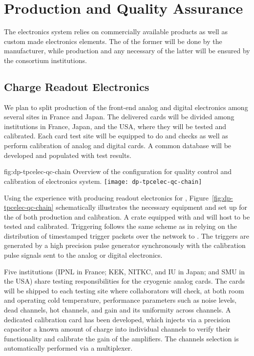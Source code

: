 \section{Production and Quality Assurance}
\label{sec:dp-tpcelec-production}

The   electronics system relies on commercially available products as well as custom made electronics elements. The  of the former will be done by the manufacturer, while production and any necessary  of the latter will be ensured by the consortium institutions. 


\subsection{Charge Readout Electronics}
\label{ssec:dp-tpcelec-prod-cro}

We plan to split production of the front-end analog and digital electronics among several sites in France and Japan. The delivered cards will be divided among institutions in France, Japan, and the USA, where they will be tested and calibrated. Each card test site will be equipped to do  and  checks as well as perform calibration of analog and digital cards. A common database will be developed and populated with test results. 

\begin{dunefigure}{fig:dp-tpcelec-qc-chain}
{Overview of the configuration for quality control and calibration of  electronics system.}
\texttt{[image: dp-tpcelec-qc-chain]}
\end{dunefigure}


Using the experience with producing  readout electronics for , Figure~\ref{fig:dp-tpcelec-qc-chain} schematically illustrates the necessary equipment and set up for the  of both production and calibration. A  crate equipped with  and  will host  to be tested and calibrated. Triggering follows the same scheme as in  relying on the distribution of timestamped trigger packets over the  network to . The triggers are generated by a high precision pulse generator synchronously with the calibration pulse signals sent to the analog or digital electronics.  

Five institutions (IPNL in France; KEK, NITKC, and IU in Japan; and SMU in the USA) share testing responsibilities for the cryogenic  analog cards. The cards will be shipped to each testing site where collaborators will check, at both room and operating cold temperature, performance parameters such as noise levels, dead channels, hot channels, and gain and its uniformity across channels. A dedicated calibration card has been developed, which injects via a precision capacitor a known amount of charge into individual  channels to verify their functionality and calibrate the gain of the amplifiers. The channels selection is automatically performed via a multiplexer.

